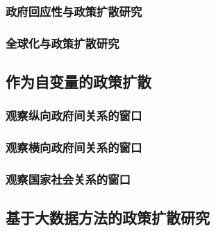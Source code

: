 \documentclass[
  12pt,
]{ctexart}
\begin{document}
\hypertarget{ux653fux5e9cux56deux5e94ux6027ux4e0eux653fux7b56ux6269ux6563ux7814ux7a76}{%
\subsubsection{政府回应性与政策扩散研究}\label{ux653fux5e9cux56deux5e94ux6027ux4e0eux653fux7b56ux6269ux6563ux7814ux7a76}}

\hypertarget{ux5168ux7403ux5316ux4e0eux653fux7b56ux6269ux6563ux7814ux7a76}{%
\subsubsection{全球化与政策扩散研究}\label{ux5168ux7403ux5316ux4e0eux653fux7b56ux6269ux6563ux7814ux7a76}}

\hypertarget{ux4f5cux4e3aux81eaux53d8ux91cfux7684ux653fux7b56ux6269ux6563}{%
\subsection{作为自变量的政策扩散}\label{ux4f5cux4e3aux81eaux53d8ux91cfux7684ux653fux7b56ux6269ux6563}}

\hypertarget{ux89c2ux5bdfux7eb5ux5411ux653fux5e9cux95f4ux5173ux7cfbux7684ux7a97ux53e3}{%
\subsubsection{观察纵向政府间关系的窗口}\label{ux89c2ux5bdfux7eb5ux5411ux653fux5e9cux95f4ux5173ux7cfbux7684ux7a97ux53e3}}

\hypertarget{ux89c2ux5bdfux6a2aux5411ux653fux5e9cux95f4ux5173ux7cfbux7684ux7a97ux53e3}{%
\subsubsection{观察横向政府间关系的窗口}\label{ux89c2ux5bdfux6a2aux5411ux653fux5e9cux95f4ux5173ux7cfbux7684ux7a97ux53e3}}

\hypertarget{ux89c2ux5bdfux56fdux5bb6ux793eux4f1aux5173ux7cfbux7684ux7a97ux53e3}{%
\subsubsection{观察国家社会关系的窗口}\label{ux89c2ux5bdfux56fdux5bb6ux793eux4f1aux5173ux7cfbux7684ux7a97ux53e3}}

\hypertarget{ux57faux4e8eux5927ux6570ux636eux65b9ux6cd5ux7684ux653fux7b56ux6269ux6563ux7814ux7a76}{%
\subsection{基于大数据方法的政策扩散研究}\label{ux57faux4e8eux5927ux6570ux636eux65b9ux6cd5ux7684ux653fux7b56ux6269ux6563ux7814ux7a76}}
\end{document}
